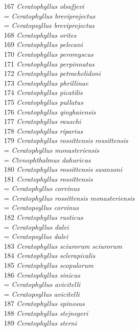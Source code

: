 \documentclass[
]{article}
\begin{document}
167 \emph{Ceratophyllus olsufjevi}\\
= \emph{Ceratophyllus breviprojectus}\\
= \emph{Ceratopsyllus breviprojectus}\\
168 \emph{Ceratophyllus orites}\\
169 \emph{Ceratophyllus pelecani}\\
170 \emph{Ceratophyllus peromyscus}\\
171 \emph{Ceratophyllus perpinnatus}\\
172 \emph{Ceratophyllus petrochelidoni}\\
173 \emph{Ceratophyllus phrillinae}\\
174 \emph{Ceratophyllus picatilis}\\
175 \emph{Ceratophyllus pullatus}\\
176 \emph{Ceratophyllus qinghaiensis}\\
177 \emph{Ceratophyllus rauschi}\\
178 \emph{Ceratophyllus riparius}\\
179 \emph{Ceratophyllus rossittensis rossittensis}\\
= \emph{Ceratophyllus monasteriensis}\\
= \emph{Ctenophthalmus dahuricus}\\
180 \emph{Ceratophyllus rossittensis swansoni}\\
181 \emph{Ceratophyllus rossittensis}\\
= \emph{Ceratophyllus corvinus}\\
= \emph{Ceratophyllus rossittensis monasteriensis}\\
= \emph{Ceratopsyllus corvinus}\\
182 \emph{Ceratophyllus rusticus}\\
= \emph{Ceratophyllus dalei}\\
= \emph{Ceratopsyllus dalei}\\
183 \emph{Ceratophyllus sciurorum sciurorum}\\
184 \emph{Ceratophyllus sclerapicalis}\\
185 \emph{Ceratophyllus scopulorum}\\
186 \emph{Ceratophyllus sinicus}\\
= \emph{Ceratophyllus avicitelli}\\
= \emph{Ceratopsyllus avicitelli}\\
187 \emph{Ceratophyllus spinosus}\\
188 \emph{Ceratophyllus stejnegeri}\\
189 \emph{Ceratophyllus sterni}\\
\end{document}
